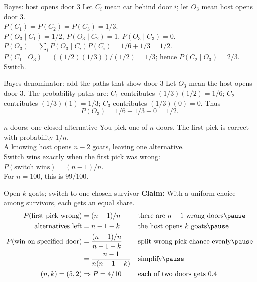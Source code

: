 \documentclass[aspectratio=169,10pt]{beamer}
\begin{document}
\begin{frame}{Bayes: host opens door 3}
Let $C_i$ mean car behind door $i$; let $O_3$ mean host opens door 3.\\[2mm]$P(C_1)=P(C_2)=P(C_3)=1/3$.\\$P(O_3\mid C_1)=1/2$, $P(O_3\mid C_2)=1$, $P(O_3\mid C_3)=0$.\\[2mm]$P(O_3)=\sum_i P(O_3\mid C_i)P(C_i)=1/6+1/3=1/2$.\\[2mm]$P(C_1\mid O_3)=((1/2)(1/3))/(1/2)=1/3$; hence $P(C_2\mid O_3)=2/3$. Switch.\end{frame}
\begin{frame}{Bayes denominator: add the paths that show door 3}
Let $O_3$ mean the host opens door 3. The probability paths are: $C_1$ contributes $(1/3)(1/2)=1/6$; $C_2$ contributes $(1/3)(1)=1/3$; $C_3$ contributes $(1/3)(0)=0$. Thus
\[P(O_3)=1/6+1/3+0=1/2.\]
\centering{}
\end{frame}
\begin{frame}{$n$ doors: one closed alternative}
You pick one of $n$ doors. The first pick is correct with probability $1/n$.\\A knowing host opens $n-2$ goats, leaving one alternative.\\Switch wins exactly when the first pick was wrong: $P(\text{switch wins})=(n-1)/n$.\\For $n=100$, this is $99/100$.\end{frame}
\begin{frame}{Open $k$ goats; switch to one chosen survivor}
\textbf{Claim:} With a uniform choice among survivors, each gets an equal share.
\begin{align*}
P(\text{first pick wrong})&=(n-1)/n &&\text{there are $n-1$ wrong doors}\pause\\
\text{alternatives left}&=n-1-k &&\text{the host opens $k$ goats}\pause\\
P(\text{win on specified door})&=\frac{(n-1)/n}{n-1-k} &&\text{split wrong-pick chance evenly}\pause\\
&=\frac{n-1}{n(n-1-k)} &&\text{simplify}\pause\\
(n,k)=(5,2)&\Rightarrow P=4/10 &&\text{each of two doors gets $0.4$}
\end{align*}
\end{frame}
\end{document}
